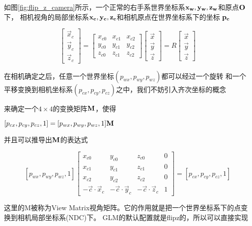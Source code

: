 

如图\ref{fig:flip_z_camera}所示，一个正常的右手系世界坐标系$\bf{x_w,y_w,z_w}$和原点$\bf{O}$下，
相机视角的局部坐标系$\bf{x_c,y_c,z_c}$和相机原点在世界坐标系下的坐标 $\bf{p}_c$

$$\left[\begin{matrix} 
    \vec{x}_c \\ \vec{y}_c \\ \vec{z}_c 
\end{matrix}\right]=
\left[\begin{matrix} 
    x_{c0} & x_{c1} & x_{c2} \\ 
    y_{c0} & y_{c1} & y_{c2} \\ 
    z_{c0} & z_{c1} & z_{c2} 
\end{matrix}\right]
\left[\begin{matrix} 
    \vec{x} \\ \vec{y} \\ \vec{z} 
\end{matrix}\right]=
R\left[\begin{matrix} 
    \vec{x} \\ \vec{y} \\ \vec{z} 
\end{matrix}\right]$$

在相机确定之后，任意一个世界坐标$(p_{wx},p_{wy},p_{wz})$都可以经过一个旋转
和一个平移变换到相机坐标系$(p_{cx},p_{cy},p_{cz})$之中，我们不妨引入齐次坐标的概念

来确定一个$4\times 4$的变换矩阵$\bf{M}$，使得

$[p_{cx},p_{cy},p_{cz},1]=[p_{wx},p_{wy},p_{wz},1]\bf{M}$

并且可以推导出$\bf{M}$的表达式

$$[p_{wx},p_{wy},p_{wz},1]
\left[\begin{matrix} 
    x_{c0} & y_{c0} & z_{c0} & 0 \\ 
    x_{c1} & y_{c1} & z_{c1} & 0 \\ 
    x_{c2} & y_{c2} & z_{c2} & 0 \\ 
    -\vec{c}\cdot\vec{x}_c &-\vec{c}\cdot\vec{y}_c &-\vec{c}\cdot\vec{z}_c & 1 
\end{matrix}\right]=[p_{cx},p_{cy},p_{cz}, 1]$$


这里的M被称为View Matrix视角矩阵。它的作用就是把一个世界坐标系下的点变换到相机局部坐标系(NDC)下。
GLM的默认配置就是flipz的，所以可以直接实现
